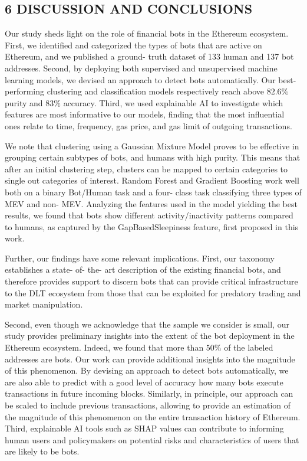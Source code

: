 \subsection*{6 DISCUSSION AND CONCLUSIONS}

Our study sheds light on the role of financial bots in the Ethereum ecosystem. First, we identified and categorized the types of bots that are active on Ethereum, and we published a ground- truth dataset of 133 human and 137 bot addresses. Second, by deploying both supervised and unsupervised machine learning models, we devised an approach to detect bots automatically. Our best- performing clustering and classification models respectively reach above \(82.6\%\) purity and \(83\%\) accuracy. Third, we used explainable AI to investigate which features are most informative to our models, finding that the most influential ones relate to time, frequency, gas price, and gas limit of outgoing transactions.

We note that clustering using a Gaussian Mixture Model proves to be effective in grouping certain subtypes of bots, and humans with high purity. This means that after an initial clustering step, clusters can be mapped to certain categories to single out categories of interest. Random Forest and Gradient Boosting work well both on a binary Bot/Human task and a four- class task classifying three types of MEV and non- MEV. Analyzing the features used in the model yielding the best results, we found that bots show different activity/inactivity patterns compared to humans, as captured by the GapBasedSleepiness feature, first proposed in this work.

Further, our findings have some relevant implications. First, our taxonomy establishes a state- of- the- art description of the existing financial bots, and therefore provides support to discern bots that can provide critical infrastructure to the DLT ecosystem from those that can be exploited for predatory trading and market manipulation.

Second, even though we acknowledge that the sample we consider is small, our study provides preliminary insights into the extent of the bot deployment in the Ethereum ecosystem. Indeed, we found that more than \(50\%\) of the labeled addresses are bots. Our work can provide additional insights into the magnitude of this phenomenon. By devising an approach to detect bots automatically, we are also able to predict with a good level of accuracy how many bots execute transactions in future incoming blocks. Similarly, in principle, our approach can be scaled to include previous transactions, allowing to provide an estimation of the magnitude of this phenomenon on the entire transaction history of Ethereum. Third, explainable AI tools such as SHAP values can contribute to informing human users and policymakers on potential risks and characteristics of users that are likely to be bots.

